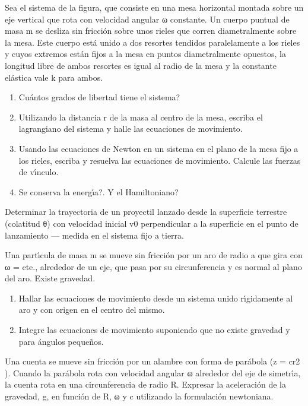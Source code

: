 \documentclass[10pt,oneside]{CBFT_book}
\begin{document}
\begin{ejercicios}

\label{ej1}
\item{ \bf }
Sea el sistema de la figura, que consiste en una mesa horizontal montada sobre un eje
vertical que rota con velocidad angular ω constante. Un cuerpo puntual de masa m
se desliza sin fricción sobre unos rieles que corren diametralmente sobre la mesa. Este
cuerpo está unido a dos resortes tendidos paralelamente a los rieles y cuyos extremos
están fijos a la mesa en puntos diametralmente opuestos, la longitud libre de ambos
resortes es igual al radio de la mesa y la constante elástica vale k para ambos.
\begin{enumerate}[label=(\alph*)]
\item Cuántos grados de libertad tiene el sistema?
\item Utilizando la distancia r de la masa al centro de la mesa, escriba el lagrangiano
del sistema y halle las ecuaciones de movimiento.
\item Usando las ecuaciones de Newton en un sistema en el plano de la mesa fijo a los
rieles, escriba y resuelva las ecuaciones de movimiento. Calcule las fuerzas de
vı́nculo.
\item Se conserva la energı́a?. Y el Hamiltoniano?
\end{enumerate}

\label{ej2}
\item{ \bf }
Determinar la trayectoria de un proyectil lanzado desde la superficie terrestre (colatitud
θ) con velocidad inicial v0 perpendicular a la superficie en el punto de lanzamiento —
medida en el sistema fijo a tierra.

\label{ej3}
\item{ \bf }
Una partı́cula de masa m se mueve sin fricción por un aro de radio a que gira con
ω = cte., alrededor de un eje, que pasa por su circunferencia y es normal al plano del
aro. Existe gravedad.
\begin{enumerate}[label=(\alph*)]
\item Hallar las ecuaciones de movimiento desde un sistema unido rı́gidamente al aro
y con origen en el centro del mismo.
\item Integre las ecuaciones de movimiento suponiendo que no existe gravedad y para
ángulos pequeños.
\end{enumerate}

\label{ej4}
\item{ \bf }
Una cuenta se mueve sin fricción por un alambre con forma de parábola (z = cr2 ).
Cuando la parábola rota con velocidad angular ω alrededor del eje de simetrı́a, la
cuenta rota en una circunferencia de radio R. Expresar la aceleración de la gravedad,
g, en función de R, ω y c utilizando la formulación newtoniana.


\end{ejercicios}
\end{document}
